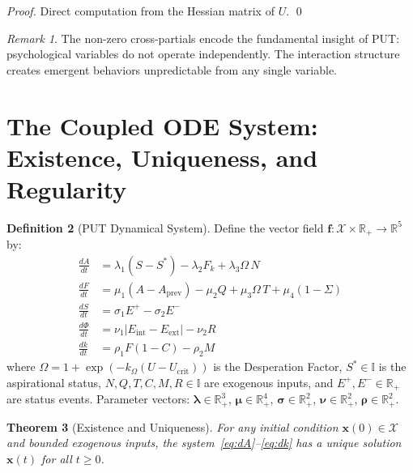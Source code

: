 \documentclass[12pt,a4paper]{article}
\theoremstyle{plain}
\newtheorem{theorem}{Theorem}[section]
\theoremstyle{definition}
\newtheorem{definition}[theorem]{Definition}
\theoremstyle{remark}
\newtheorem{remark}[theorem]{Remark}
\newcommand{\R}{\mathbb{R}}
\newcommand{\I}{\mathbb{I}}
\newcommand{\X}{\mathcal{X}}
\newcommand{\Fk}{F_k}
\newcommand{\Ucrit}{U_{\mathrm{crit}}}
\newcommand{\blambda}{\boldsymbol{\lambda}}
\newcommand{\bmu}{\boldsymbol{\mu}}
\newcommand{\bsigma}{\boldsymbol{\sigma}}
\newcommand{\bnu}{\boldsymbol{\nu}}
\newcommand{\brho}{\boldsymbol{\rho}}
\begin{document}
\begin{proof}
Direct computation from the Hessian matrix of $U$. \qed
\end{proof}

\begin{remark}
The non-zero cross-partials encode the fundamental insight of PUT: psychological variables do not operate independently. The interaction structure creates emergent behaviors unpredictable from any single variable.
\end{remark}

\section{The Coupled ODE System: Existence, Uniqueness, and Regularity}

\begin{definition}[PUT Dynamical System]\label{def:ode}
Define the vector field $\mathbf{f}: \X \times \R_+ \to \R^5$ by:
\begin{align}
\frac{dA}{dt} &= \lambda_1(S - S^*) - \lambda_2 \Fk + \lambda_3 \Omega\, N \label{eq:dA}\\
\frac{dF}{dt} &= \mu_1(A - A_{\mathrm{prev}}) - \mu_2 Q + \mu_3 \Omega\, T + \mu_4(1-\Sigma) \label{eq:dF}\\
\frac{dS}{dt} &= \sigma_1 E^+ - \sigma_2 E^- \label{eq:dS}\\
\frac{d\Phi}{dt} &= \nu_1 |E_{\mathrm{int}} - E_{\mathrm{ext}}| - \nu_2 R \label{eq:dPhi}\\
\frac{dk}{dt} &= \rho_1 F(1-C) - \rho_2 M \label{eq:dk}
\end{align}
where $\Omega = 1 + \exp(-k_\Omega(U - \Ucrit))$ is the Desperation Factor, $S^* \in \I$ is the aspirational status, $N, Q, T, C, M, R \in \I$ are exogenous inputs, and $E^+, E^- \in \R_+$ are status events. Parameter vectors: $\blambda \in \R_+^3$, $\bmu \in \R_+^4$, $\bsigma \in \R_+^2$, $\bnu \in \R_+^2$, $\brho \in \R_+^2$.
\end{definition}

\begin{theorem}[Existence and Uniqueness]\label{thm:existence}
For any initial condition $\mathbf{x}(0) \in \X$ and bounded exogenous inputs, the system~\eqref{eq:dA}--\eqref{eq:dk} has a unique solution $\mathbf{x}(t)$ for all $t \geq 0$.
\end{theorem}
\end{document}
